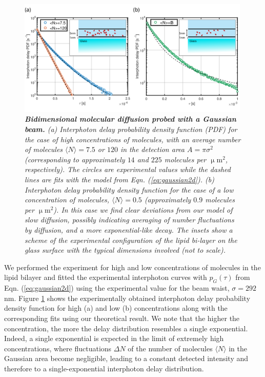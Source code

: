 \begin{figure}
\includegraphics[width=0.99\textwidth]{03_Figure_3_2D_gaussian_with_single}%
\caption{\textit{\textbf{Bidimensional molecular diffusion probed with a Gaussian beam.} 
(a) Interphoton delay probability density function (PDF) for the case 
of high concentrations of molecules, with an average
number of molecules $\langle N \rangle=7.5$ or $120$ in the detection area 
$A=\pi\sigma^2$ (corresponding to approximately $14$ and $225$ molecules 
per $\upmu\mbox{m}^2$, respectively). The circles are experimental values 
while the dashed lines are fits with the model from Eqn. (\ref{eq:gaussian2d}). 
(b) Interphoton delay probability density function for the case of a low concentration
of molecules, $\langle N \rangle=0.5$ (approximately $0.9$ molecules per $\upmu\mbox{m}^2$). 
In this case we find clear deviations from our model of slow diffusion, possibly indicating averaging of number fluctuations by diffusion, and a more exponential-like decay. The insets show a scheme of the experimental configuration of the lipid bi-layer on the glass surface with the typical dimensions involved (not to scale).
\label{fg:gaussian2d}}}
\end{figure}

We performed the experiment for high and low concentrations 
of molecules in the lipid bilayer and fitted 
the experimental interphoton curves with $p_{G}(\tau)$ from 
Eqn. (\ref{eq:gaussian2d}) using the experimental value for the beam 
waist, $\sigma=292$ nm. Figure \ref{fg:gaussian2d} shows the experimentally 
obtained interphoton delay probability density function for high (a) and 
low (b) concentrations along with the corresponding fits using our theoretical result. 
We note that the higher the concentration, the more the delay distribution 
resembles a single exponential. Indeed, a single exponential is expected in 
the limit of extremely high concentrations, where fluctuations $\Delta N$ 
of the number of molecules $\langle N \rangle$ in the Gaussian area become 
negligible, leading to a constant detected intensity and therefore to a single-exponential 
interphoton delay distribution.

